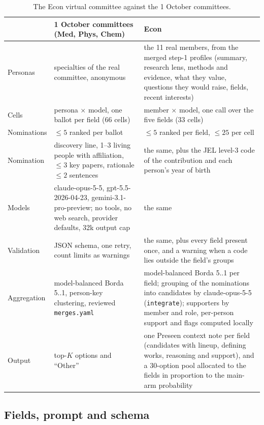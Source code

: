 \documentclass[11pt,a4paper]{article}
\newcommand{\code}[1]{\texttt{#1}}
\begin{document}
\begin{table}[h]
\small
\begin{tabularx}{\textwidth}{@{}lLL@{}}
\toprule
 & 1 October committees (Med, Phys, Chem) & Econ \\
\midrule
Personas & specialties of the real committee, anonymous & the 11 real members, from the merged step-1 profiles (summary, research lens, methods and evidence, what they value, questions they would raise, fields, recent interests) \\
Cells & persona $\times$ model, one ballot per field (66 cells) & member $\times$ model, one call over the five fields (33 cells) \\
Nominations & $\leq 5$ ranked per ballot & $\leq 5$ ranked per field, $\leq 25$ per cell \\
Nomination & discovery line, 1--3 living people with affiliation, $\leq 3$ key papers, rationale $\leq 2$ sentences & the same, plus the JEL level-3 code of the contribution and each person's year of birth \\
Models & claude-opus-5-5, gpt-5.5-2026-04-23, gemini-3.1-pro-preview; no tools, no web search, provider defaults, 32k output cap & the same \\
Validation & JSON schema, one retry, count limits as warnings & the same, plus every field present once, and a warning when a code lies outside the field's groups \\
Aggregation & model-balanced Borda 5..1, person-key clustering, reviewed \code{merges.yaml} & model-balanced Borda 5..1 per field; grouping of the nominations into candidates by claude-opus-5-5 (\code{integrate}); supporters by member and role, per-person support and flags computed locally \\
Output & top-$K$ options and ``Other'' & one Preseen context note per field (candidates with lineup, defining works, reasoning and support), and a 30-option pool allocated to the fields in proportion to the main-arm probability \\
\bottomrule
\end{tabularx}
\caption{The Econ virtual committee against the 1 October committees.}
\end{table}

\subsection{Fields, prompt and schema}
\end{document}

